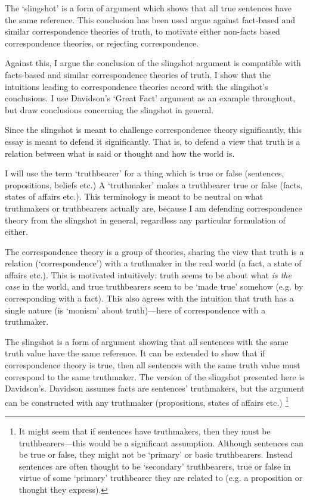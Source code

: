 The `slingshot' is a form of argument which shows that all true sentences have the same reference.
This conclusion has been used argue against fact-based and similar correspondence theories of truth, to motivate either non-facts based correspondence theories, or rejecting correspondence.

Against this, I argue the conclusion of the slingshot argument is compatible with facts-based and similar correspondence theories of truth.
I show that the intuitions leading to correspondence theories accord with the slingshot's conclusions.
I use Davidson's `Great Fact' argument as an example throughout, but draw conclusions concerning the slingshot in general.

Since the slingshot is meant to challenge correspondence theory significantly, this essay is meant to defend it significantly.
That is, to defend a view that truth is a relation between what is said or thought and how the world is.

I will use the term `truthbearer' for a thing which is true or false (sentences, propositions, beliefs etc.)
A `truthmaker' makes a truthbearer true or false (facts, states of affairs etc.).
This terminology is meant to be neutral on what truthmakers or truthbearers actually are, because I am defending correspondence theory from the slingshot in general, regardless any particular formulation of either.

The correspondence theory is a group of theories, sharing the view that truth is a relation (`correspondence') with a truthmaker in the real world (a fact, a state of affairs etc.).
This is motivated intuitively: truth seems to be about what \emph{is the case} in the world, and true truthbearers seem to be `made true' somehow (e.g. by corresponding with a fact).
This also agrees with the intuition that truth has a single nature (is `monism' about truth)---here of correspondence with a truthmaker.

The slingshot is a form of argument showing that all sentences with the same truth value have the same reference.
It can be extended to show that if correspondence theory is true, then all sentences with the same truth value must correspond to the same truthmaker.
The version of the slingshot presented here is Davidson's.
\parencite[753]{Davidson_1969}
Davidson assumes facts are sentences' truthmakers, but the argument can be constructed with any truthmaker (propositions, states of affairs etc.)
\footnote{
It might seem that if sentences have truthmakers, then they must be truthbearers---this would be a significant assumption.
Although sentences can be true or false, they might not be `primary' or basic truthbearers.
Instead sentences are often thought to be `secondary' truthbearers, true or false in virtue of some `primary' truthbearer they are related to (e.g. a proposition or thought they express).
}
\parencite[752]{Davidson_1969}

